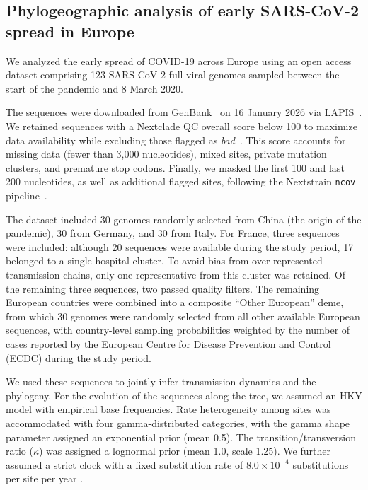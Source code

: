 \subsection{Phylogeographic analysis of early SARS-CoV-2 spread in Europe}

We analyzed the early spread of COVID-19 across Europe using an open access dataset comprising 123 SARS-CoV-2 full viral genomes sampled between the start of the pandemic and 8 March 2020.

The sequences were downloaded from GenBank~\cite{ncbi_virus} on 16 January 2026 via LAPIS~\cite{chen2023lapis}. We retained sequences with a Nextclade QC overall score below 100 to maximize data availability while excluding those flagged as \textit{bad}~\cite{aksamentov2021nextclade}. This score accounts for missing data (fewer than 3,000 nucleotides), mixed sites, private mutation clusters, and premature stop codons. Finally, we masked the first 100 and last 200 nucleotides, as well as additional flagged sites, following the Nextstrain \texttt{ncov} pipeline~\cite{nextstrain_ncov_2026}.

The dataset included 30 genomes randomly selected from China (the origin of the pandemic), 30 from Germany, and 30 from Italy.
For France, three sequences were included: although 20 sequences were available during the study period, 17 belonged to a single hospital cluster. To avoid bias from over-represented transmission chains, only one representative from this cluster was retained. Of the remaining three sequences, two passed quality filters.
The remaining European countries were combined into a composite “Other European” deme, from which 30 genomes were randomly selected from all other available European sequences, with country-level sampling probabilities weighted by the number of cases reported by the European Centre for Disease Prevention and Control (ECDC) during the study period.

We used these sequences to jointly infer transmission dynamics and the phylogeny.
For the evolution of the sequences along the tree, we assumed an HKY model \cite{hasegawa1985dating} with empirical base frequencies.
Rate heterogeneity among sites was accommodated with four gamma-distributed categories, with the gamma shape parameter assigned an exponential prior (mean 0.5).
The transition/transversion ratio (\(\kappa\)) was assigned a lognormal prior (mean 1.0, scale 1.25).
We further assumed a strict clock with a fixed substitution rate of \(8.0 \times 10^{-4}\) substitutions per site per year \cite{nadeau2021origin}.

